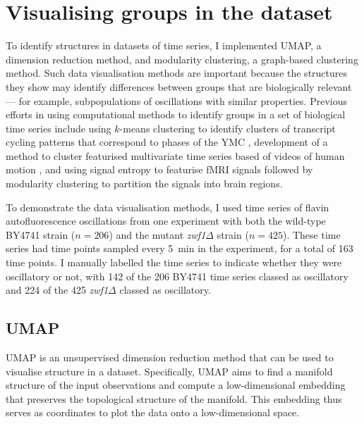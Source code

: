 \section{Visualising groups in the dataset}
\label{sec:analysis-clustering}

To identify structures in datasets of time series, I implemented UMAP, a dimension reduction method, and modularity clustering, a graph-based clustering method.
Such data visualisation methods are important because the structures they show may identify differences between groups that are biologically relevant --- for example, subpopulations of oscillations with similar properties.
Previous efforts in using computational methods to identify groups in a set of biological time series include using $k$-means clustering to identify clusters of transcript cycling patterns that correspond to phases of the YMC \parencite{tuLogicYeastMetabolic2005}, development of a method to cluster featurised multivariate time series based of videos of human motion \parencite{wangStructureBasedStatisticalFeatures2007}, and using signal entropy to featurise fMRI signals followed by modularity clustering to partition the signals into brain regions.

To demonstrate the data visualisation methods, I used time series of flavin autofluorescence oscillations from one experiment with both the wild-type BY4741 strain ($n=206$) and the mutant \textit{zwf1$\Delta$} strain ($n=425$).
These time series had time points sampled every \SI{5}{\minute} in the experiment, for a total of 163 time points.
I manually labelled the time series to indicate whether they were oscillatory or not, with 142 of the 206 BY4741 time series classed as oscillatory and 224 of the 425 \textit{zwf1$\Delta$} classed as oscillatory.


\subsection{UMAP}
\label{subsec:analysis-clustering-umap}

UMAP \parencite{mcinnesUMAPUniformManifold2020} is an unsupervised dimension reduction method that can be used to visualise structure in a dataset.
Specifically, UMAP aims to find a manifold structure of the input observations and compute a low-dimensional embedding that preserves the topological structure of the manifold.
This embedding thus serves as coordinates to plot the data onto a low-dimensional space.

